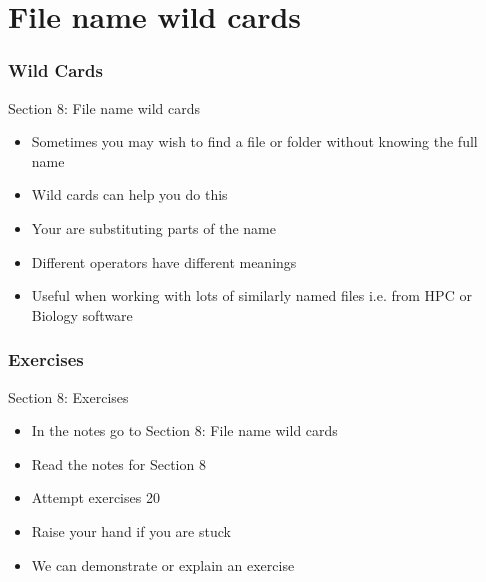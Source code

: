 \part{File name wild cards}
\begin{frame}
\partpage
\end{frame}

\section{Wild Cards}
\begin{frame}{Section 8: File name wild cards}
\begin{itemize}
\item Sometimes you may wish to find a file or folder without knowing the full name
\item Wild cards can help you do this
\item Your are substituting parts of the name
\item Different operators have different meanings
\item Useful when working with lots of similarly named files i.e. from HPC or Biology software
\end{itemize}
\end{frame}


\section{Exercises}
\begin{frame}{Section 8: Exercises}
\begin{itemize}
\item In the notes go to {Section 8: File name wild cards}
\item Read the notes for Section 8 
\item Attempt exercises 20
\item Raise your hand if you are stuck
\item We can demonstrate or explain an exercise
\end{itemize}
\end{frame}

